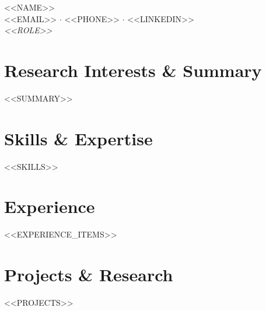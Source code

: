 \documentclass[letterpaper,11pt]{article}
\begin{document}
\begin{center}
  {\LARGE \textsc{<<NAME>>}} \\[6pt]
  \small <<EMAIL>> \quad $\cdot$ \quad <<PHONE>> \quad $\cdot$ \quad <<LINKEDIN>> \\[4pt]
  \textit{<<ROLE>>}
\end{center}

\vspace{4pt}

\section{Research Interests \& Summary}
<<SUMMARY>>

\section{Skills \& Expertise}
<<SKILLS>>

\section{Experience}
\begin{itemize}[leftmargin=*, itemsep=4pt]
<<EXPERIENCE_ITEMS>>
\end{itemize}

\section{Projects \& Research}
<<PROJECTS>>
\end{document}
